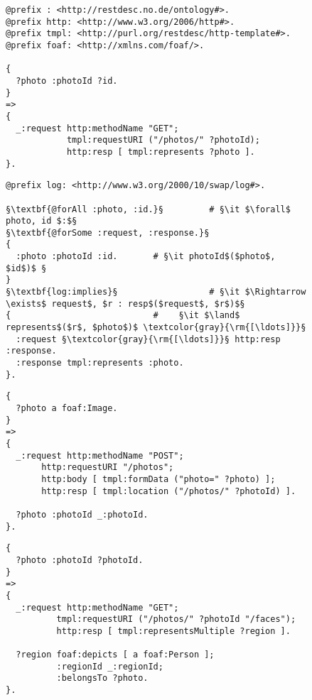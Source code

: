 \documentclass[runningheads,a4paper, twocolumn]{llncs}
\begin{document}
\begin{figure}[float=t!]
\vspace{.5em}
\begin{lstlisting}[caption=RESTdesc description of photo retrieval,
                   label=lst:PhotoGet, escapechar=§]
@prefix : <http://restdesc.no.de/ontology#>.
@prefix http: <http://www.w3.org/2006/http#>.
@prefix tmpl: <http://purl.org/restdesc/http-template#>.
@prefix foaf: <http://xmlns.com/foaf/>.

{
  ?photo :photoId ?id.
}
=>
{
  _:request http:methodName "GET";
            tmpl:requestURI ("/photos/" ?photoId);
            http:resp [ tmpl:represents ?photo ].
}.
\end{lstlisting}

\begin{lstlisting}[caption=\autoref{lst:PhotoGet} with explicit quantifiers,
                   label=lst:PhotoGetQuantifiers, escapechar=§]
@prefix log: <http://www.w3.org/2000/10/swap/log#>.

§\textbf{@forAll :photo, :id.}§         # §\it $\forall$ photo, id $:$§
§\textbf{@forSome :request, :response.}§
{
  :photo :photoId :id.       # §\it photoId$($photo$, $id$)$ §
}
§\textbf{log:implies}§                  # §\it $\Rightarrow \exists$ request$, $r : resp$($request$, $r$)$§
{                            #    §\it $\land$ represents$($r$, $photo$)$ \textcolor{gray}{\rm{[\ldots]}}§
  :request §\textcolor{gray}{\rm{[\ldots]}}§ http:resp :response.
  :response tmpl:represents :photo.
}.
\end{lstlisting}

\begin{lstlisting}[caption=RESTdesc description of photo upload,
                   label=lst:PhotoUpload, escapechar=§]
{
  ?photo a foaf:Image.
}
=>
{
  _:request http:methodName "POST";
       http:requestURI "/photos";
       http:body [ tmpl:formData ("photo=" ?photo) ];
       http:resp [ tmpl:location ("/photos/" ?photoId) ].

  ?photo :photoId _:photoId.
}.
\end{lstlisting}

\begin{lstlisting}[caption=RESTdesc description of face detection,
                   label=lst:FaceDetection, escapechar=§]
{
  ?photo :photoId ?photoId.
}
=>
{
  _:request http:methodName "GET";
          tmpl:requestURI ("/photos/" ?photoId "/faces");
          http:resp [ tmpl:representsMultiple ?region ].
  
  ?region foaf:depicts [ a foaf:Person ];
          :regionId _:regionId;
          :belongsTo ?photo.
}.
\end{lstlisting}


\end{figure}
\end{document}
